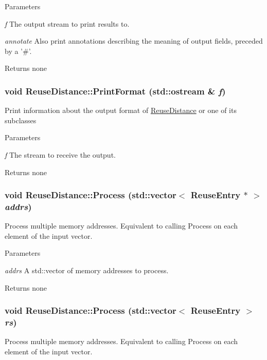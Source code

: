 \begin{DoxyParams}{Parameters}
\item[{\em f}]The output stream to print results to. \item[{\em annotate}]Also print annotations describing the meaning of output fields, preceded by a '\#'.\end{DoxyParams}
\begin{DoxyReturn}{Returns}
none 
\end{DoxyReturn}
\hypertarget{class_reuse_distance_a027a92a58a6639e8ed13a7490d11dcf5}{
\subsubsection[{PrintFormat}]{\setlength{\rightskip}{0pt plus 5cm}void ReuseDistance::PrintFormat (std::ostream \& {\em f})}}
\label{class_reuse_distance_a027a92a58a6639e8ed13a7490d11dcf5}
Print information about the output format of \hyperlink{class_reuse_distance}{ReuseDistance} or one of its subclasses


\begin{DoxyParams}{Parameters}
\item[{\em f}]The stream to receive the output.\end{DoxyParams}
\begin{DoxyReturn}{Returns}
none 
\end{DoxyReturn}
\hypertarget{class_reuse_distance_a88052f5ae1e69bab8fe1f9b7b87c1037}{
\subsubsection[{Process}]{\setlength{\rightskip}{0pt plus 5cm}void ReuseDistance::Process (std::vector$<$ {\bf ReuseEntry} $\ast$ $>$ {\em addrs})}}
\label{class_reuse_distance_a88052f5ae1e69bab8fe1f9b7b87c1037}
Process multiple memory addresses. Equivalent to calling Process on each element of the input vector.


\begin{DoxyParams}{Parameters}
\item[{\em addrs}]A std::vector of memory addresses to process.\end{DoxyParams}
\begin{DoxyReturn}{Returns}
none 
\end{DoxyReturn}
\hypertarget{class_reuse_distance_a372960c10d5fb6552c8dfcfd77da38ba}{
\subsubsection[{Process}]{\setlength{\rightskip}{0pt plus 5cm}void ReuseDistance::Process (std::vector$<$ {\bf ReuseEntry} $>$ {\em rs})}}
\label{class_reuse_distance_a372960c10d5fb6552c8dfcfd77da38ba}
Process multiple memory addresses. Equivalent to calling Process on each element of the input vector.


